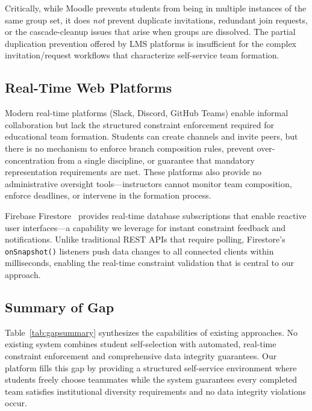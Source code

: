 \documentclass[conference]{IEEEtran}
\begin{document}
Critically, while Moodle prevents students from being in multiple instances of the same group set, it does \textit{not} prevent duplicate invitations, redundant join requests, or the cascade-cleanup issues that arise when groups are dissolved. The partial duplication prevention offered by LMS platforms is insufficient for the complex invitation/request workflows that characterize self-service team formation.

\subsection{Real-Time Web Platforms}

Modern real-time platforms (Slack, Discord, GitHub Teams) enable informal collaboration but lack the structured constraint enforcement required for educational team formation. Students can create channels and invite peers, but there is no mechanism to enforce branch composition rules, prevent over-concentration from a single discipline, or guarantee that mandatory representation requirements are met. These platforms also provide no administrative oversight tools---instructors cannot monitor team composition, enforce deadlines, or intervene in the formation process.

Firebase Firestore~\cite{firebase} provides real-time database subscriptions that enable reactive user interfaces---a capability we leverage for instant constraint feedback and notifications. Unlike traditional REST APIs that require polling, Firestore's \texttt{onSnapshot()} listeners push data changes to all connected clients within milliseconds, enabling the real-time constraint validation that is central to our approach.

\subsection{Summary of Gap}

Table~\ref{tab:gapsummary} synthesizes the capabilities of existing approaches. No existing system combines student self-selection with automated, real-time constraint enforcement and comprehensive data integrity guarantees. Our platform fills this gap by providing a structured self-service environment where students freely choose teammates while the system guarantees every completed team satisfies institutional diversity requirements and no data integrity violations occur.
\end{document}
